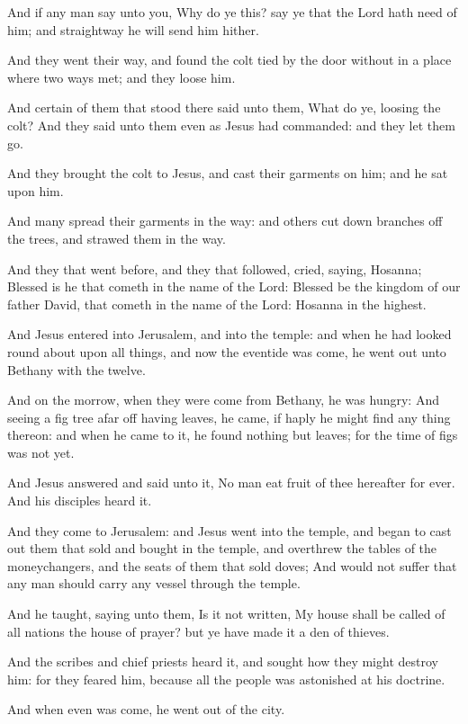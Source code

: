 \verse And if any man say unto you, Why do ye this? say ye that the Lord hath need of him; and straightway he will send him hither.

\verse And they went their way, and found the colt tied by the door without in a place where two ways met; and they loose him.

\verse And certain of them that stood there said unto them, What do ye, loosing the colt?  \verse And they said unto them even as Jesus had commanded: and they let them go.

\verse And they brought the colt to Jesus, and cast their garments on him; and he sat upon him.

\verse And many spread their garments in the way: and others cut down branches off the trees, and strawed them in the way.

\verse And they that went before, and they that followed, cried, saying, Hosanna; Blessed is he that cometh in the name of the Lord: \verse Blessed be the kingdom of our father David, that cometh in the name of the Lord: Hosanna in the highest.

\verse And Jesus entered into Jerusalem, and into the temple: and when he had looked round about upon all things, and now the eventide was come, he went out unto Bethany with the twelve.

\verse And on the morrow, when they were come from Bethany, he was hungry: \verse And seeing a fig tree afar off having leaves, he came, if haply he might find any thing thereon: and when he came to it, he found nothing but leaves; for the time of figs was not yet.

\verse And Jesus answered and said unto it, No man eat fruit of thee hereafter for ever. And his disciples heard it.

\verse And they come to Jerusalem: and Jesus went into the temple, and began to cast out them that sold and bought in the temple, and overthrew the tables of the moneychangers, and the seats of them that sold doves; \verse And would not suffer that any man should carry any vessel through the temple.

\verse And he taught, saying unto them, Is it not written, My house shall be called of all nations the house of prayer? but ye have made it a den of thieves.

\verse And the scribes and chief priests heard it, and sought how they might destroy him: for they feared him, because all the people was astonished at his doctrine.

\verse And when even was come, he went out of the city.


